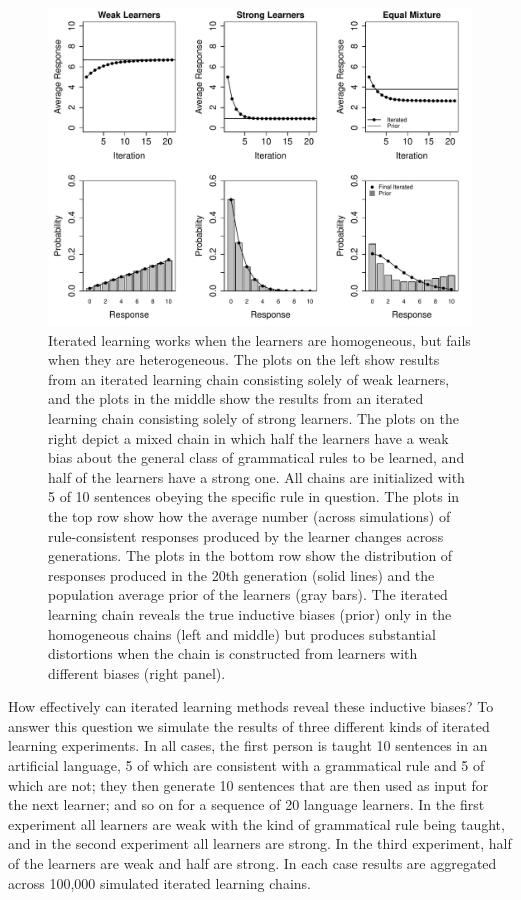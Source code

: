 \documentclass[doc]{apa6}
\begin{document}
\begin{figure}[p]
\begin{center}
\includegraphics[width=15cm]{coinsfail1.pdf}
\caption{{\small Iterated learning works when the learners are homogeneous, but fails when they are heterogeneous. The plots on the left show results from an iterated learning chain consisting solely of {\sc weak} learners, and the plots in the middle show the results from an iterated learning chain consisting solely of {\sc strong} learners. The plots on the right depict a mixed chain in which half the learners have a {\sc weak} bias about the general class of grammatical rules to be learned, and half of the learners have a {\sc strong} one. All chains are initialized with 5 of 10 sentences obeying the specific rule in question. The plots in the top row show how the average number (across simulations) of rule-consistent responses produced by the learner changes across generations. The plots in the bottom row show the distribution of responses produced in the 20th generation (solid lines) and the population average prior of the learners (gray bars). The iterated learning chain reveals the true inductive biases (prior) only in the homogeneous chains (left and middle) but produces substantial distortions when the chain is constructed from learners with different biases (right panel).}}
\label{coinsfail1}
\end{center}
\end{figure}

How effectively can iterated learning methods reveal these inductive biases? To answer this question we simulate the results of three different kinds of iterated learning experiments. In all cases, the first person is taught 10 sentences in an artificial language, 5 of which are consistent with a grammatical rule and 5 of which are not; they then generate 10 sentences that are then used as input for the next learner; and so on for a sequence of 20 language learners. In the first experiment all learners are {\sc weak} with the kind of grammatical rule being taught, and in the second experiment all learners are {\sc strong}. In the third experiment, half of the learners are {\sc weak} and half are {\sc strong}. In each case results are aggregated across 100,000 simulated iterated learning chains.
\end{document}
